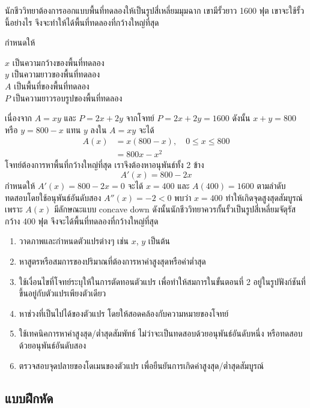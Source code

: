 \documentclass[
]{book}
\begin{document}
นักชีววิทยาต้องการออกแบบพื้นที่ทดลองให้เป็นรูปสี่เหลี่ยมมุมฉาก เขามีรั้วยาว 1600 ฟุต
เขาจะใช้รั้วนี้อย่างไร จึงจะทำให้ได้พื้นที่ทดลองที่กว้างใหญ่ที่สุด

กำหนดให้

\(x\) เป็นความกว้างของพื้นที่ทดลอง\\
\(y\) เป็นความยาวของพื้นที่ทดลอง\\
\(A\) เป็นพื้นที่ของพื้นที่ทดลอง\\
\(P\) เป็นความยาวรอบรูปของพื้นที่ทดลอง

เนื่องจาก \(A=xy\) และ \(P=2x+2y\) จากโจทย์ \(P=2x+2y=1600\) ดังนั้น
\(x+y=800\) หรือ \(y=800-x\) แทน \(y\) ลงใน \(A=xy\) จะได้
\begin{equation}   \begin{aligned}
    A(x)  &=x(800-x), \quad  0 \le x \le 800 \\
            &=800x-x^2
  \end{aligned} \end{equation} โจทย์ต้องการหาพื้นที่กว้างใหญ่ที่สุด
เราจึงต้องหาอนุพันธ์ทั้ง 2 ข้าง \[A'(x)=800-2x\] กำหนดให้ \(A'(x)=800-2x=0\) จะได้
\(x=400\) และ \(A(400)=1600\) ตามลำดับ ทดสอบโดยใช้อนุพันธ์อันดับสอง
\(A''(x)=-2<0\) พบว่า \(x=400\) ทำให้เกิดจุดสูงสุดสัมบูรณ์ เพราะ \(A(x)\)
มีลักษณะแบบ concave down ดังนั้นนักชีววิทยาควรกั้นรั้วเป็นรูปสี่เหลี่ยมจัตุรัสกว้าง 400 ฟุต
จึงจะได้พื้นที่ทดลองที่กว้างใหญ่ที่สุด

\begin{enumerate}
\def\labelenumi{\arabic{enumi}.}
\item
  วาดภาพและกำหนดตัวแปรต่างๆ เช่น \(x\), \(y\) เป็นต้น
\item
  หาสูตรหรือสมการของปริมาณที่ต้องการหาค่าสูงสุดหรือค่าต่ำสุด
\item
  ใช้เงื่อนไขที่โจทย์ระบุให้ในการตัดทอนตัวแปร เพื่อทำให้สมการในขั้นตอนที่ 2
  อยู่ในรูปฟังก์ชันที่ขึ้นอยู่กับตัวแปรเพียงตัวเดียว
\item
  หาช่วงที่เป็นไปได้ของตัวแปร โดยให้สอดคล้องกับความหมายของโจทย์
\item
  ใช้เทคนิคการหาค่าสูงสุด/ต่ำสุดสัมพัทธ์ ไม่ว่าจะเป็นทดสอบด้วยอนุพันธ์อันดับหนึ่ง
  หรือทดสอบด้วยอนุพันธ์อันดับสอง
\item
  ตรวจสอบจุดปลายของโดเมนของตัวแปร เพื่อยืนยันการเกิดค่าสูงสุด/ต่ำสุดสัมบูรณ์
\end{enumerate}

\subsection{แบบฝึกหัด}\label{uxe41uxe1auxe1auxe1duxe01uxe2buxe14-6}
\end{document}

